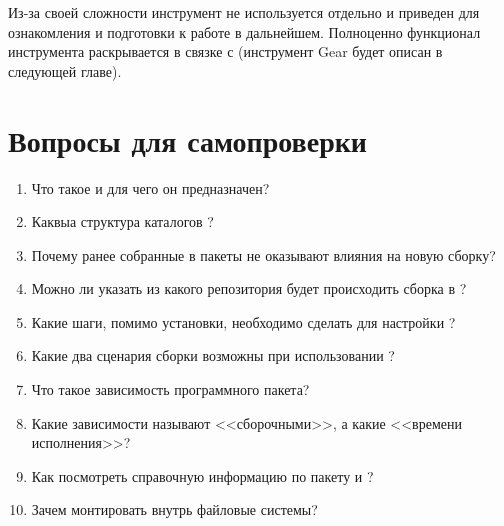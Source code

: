 Из-за своей сложности инструмент не используется отдельно и приведен для ознакомления и
подготовки к работе в дальнейшем. Полноценно функционал инструмента раскрывается в связке
с (инструмент Gear будет описан в следующей главе).

\section{Вопросы для самопроверки}

\begin{enumerate}
    \item Что такое  и для чего он предназначен?
    \item Каквыа структура каталогов ?
    \item Почему ранее собранные в  пакеты не оказывают влияния на новую сборку?
    \item Можно ли указать из какого репозитория будет происходить сборка в ?
    \item Какие шаги, помимо установки, необходимо сделать для настройки ?
    \item Какие два сценария сборки возможны при использовании ?
    \item Что такое зависимость программного пакета?
    \item Какие зависимости называют <<сборочными>>, а какие <<времени исполнения>>?
    \item Как посмотреть справочную информацию по пакету  и ?
    \item Зачем монтировать внутрь  файловые системы?
\end{enumerate}